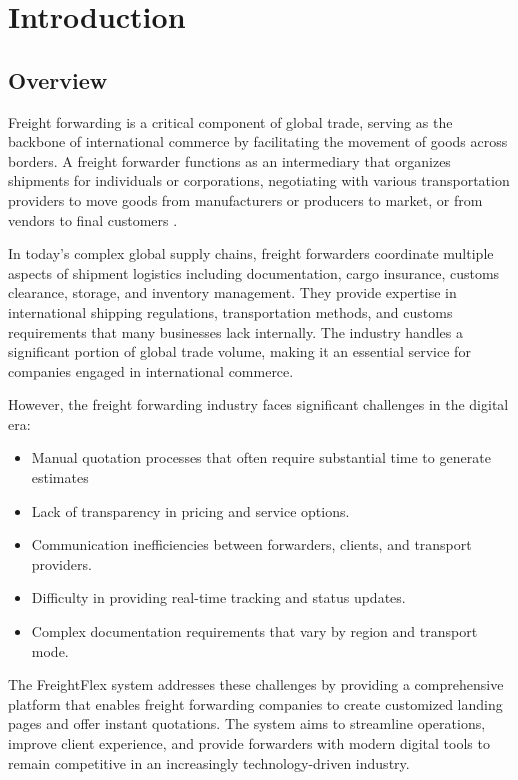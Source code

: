 \chapter{Introduction}

\section{Overview}

Freight forwarding is a critical component of global trade, serving as the backbone of international commerce by facilitating the movement of goods across borders. A freight forwarder functions as an intermediary that organizes shipments for individuals or corporations, negotiating with various transportation providers to move goods from manufacturers or producers to market, or from vendors to final customers \cite{wto2022}.

In today's complex global supply chains, freight forwarders coordinate multiple aspects of shipment logistics including documentation, cargo insurance, customs clearance, storage, and inventory management. They provide expertise in international shipping regulations, transportation methods, and customs requirements that many businesses lack internally. The industry handles a significant portion of global trade volume, making it an essential service for companies engaged in international commerce.

However, the freight forwarding industry faces significant challenges in the digital era:

\begin{itemize}
    \item Manual quotation processes that often require substantial time to generate estimates \cite{oecd2021}
    \item Lack of transparency in pricing and service options.
    \item Communication inefficiencies between forwarders, clients, and transport providers.
    \item Difficulty in providing real-time tracking and status updates.
    \item Complex documentation requirements that vary by region and transport mode.
\end{itemize}

The FreightFlex system addresses these challenges by providing a comprehensive platform that enables freight forwarding companies to create customized landing pages and offer instant quotations. The system aims to streamline operations, improve client experience, and provide forwarders with modern digital tools to remain competitive in an increasingly technology-driven industry.
